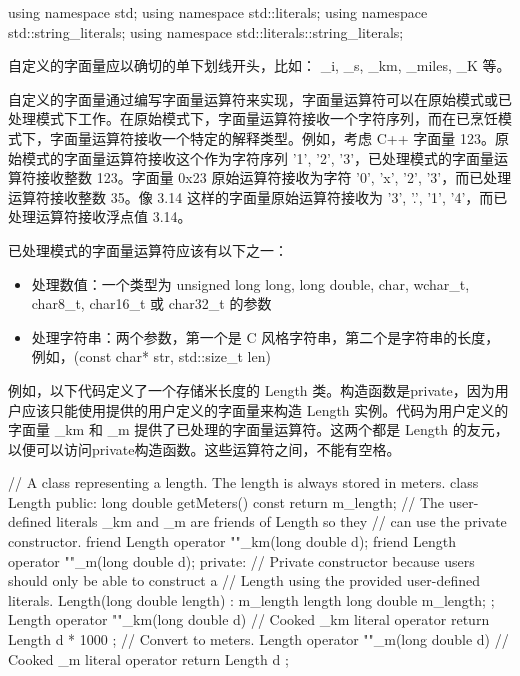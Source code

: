 \begin{cpp}
using namespace std;
using namespace std::literals;
using namespace std::string_literals;
using namespace std::literals::string_literals;
\end{cpp}



自定义的字面量应以确切的单下划线开头，比如： \_i, \_s, \_km, \_miles, \_K 等。

自定义的字面量通过编写字面量运算符来实现，字面量运算符可以在原始模式或已处理模式下工作。在原始模式下，字面量运算符接收一个字符序列，而在已烹饪模式下，字面量运算符接收一个特定的解释类型。例如，考虑 C++ 字面量 123。原始模式的字面量运算符接收这个作为字符序列 '1', '2', '3'，已处理模式的字面量运算符接收整数 123。字面量 0x23 原始运算符接收为字符 '0', 'x', '2', '3'，而已处理运算符接收整数 35。像 3.14 这样的字面量原始运算符接收为 '3', '.', '1', '4'，而已处理运算符接收浮点值 3.14。


已处理模式的字面量运算符应该有以下之一：

\begin{itemize}
\item
处理数值：一个类型为 unsigned long long, long double, char, wchar\_t, char8\_t, char16\_t 或 char32\_t 的参数

\item
处理字符串：两个参数，第一个是 C 风格字符串，第二个是字符串的长度，例如，(const char* str, std::size\_t len)
\end{itemize}

例如，以下代码定义了一个存储米长度的 Length 类。构造函数是private，因为用户应该只能使用提供的用户定义的字面量来构造 Length 实例。代码为用户定义的字面量 \_km 和 \_m 提供了已处理的字面量运算符。这两个都是 Length 的友元，以便可以访问private构造函数。这些运算符之间，不能有空格。

\begin{cpp}
// A class representing a length. The length is always stored in meters.
class Length
{
    public:
        long double getMeters() const { return m_length; }
        // The user-defined literals _km and _m are friends of Length so they
        // can use the private constructor.
        friend Length operator ""_km(long double d);
        friend Length operator ""_m(long double d);
    private:
        // Private constructor because users should only be able to construct a
        // Length using the provided user-defined literals.
        Length(long double length) : m_length { length } {}
        long double m_length;
};
Length operator ""_km(long double d) // Cooked _km literal operator
{
    return Length { d * 1000 }; // Convert to meters.
}
Length operator ""_m(long double d) // Cooked _m literal operator
{
    return Length { d };
}
\end{cpp}

